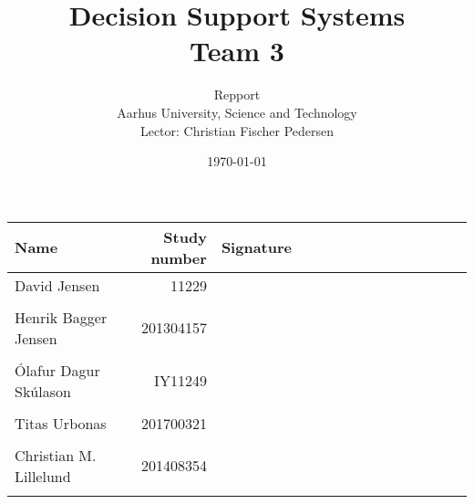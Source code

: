 \documentclass[a4paper,11pt,twoside,openright]{memoir}
\title{Decision Support Systems \\ Team 3}
\author{Repport \\ Aarhus University, Science and Technology \\ Lector: Christian Fischer Pedersen}
\date{\today}
\begin{document}
\fancyhf{} %
\frontmatter
\maketitle
\vfill


\begin{table} [h]
	\centering
	\begin{tabular}{|l|r|l|}
	\hline 
	\textbf{Name} 				& \textbf{Study number} & \textbf{Signature~~~~~~~~~~~~~~~~~~~~} 	\\ \hline
	David Jensen 				& 11229 	& \\ && 												\\ \hline
	Henrik Bagger Jensen 		& 201304157 & \\ && 												\\ \hline
	Ólafur Dagur Skúlason 		& IY11249	& \\ && 												\\ \hline
	Titas Urbonas 				& 201700321 & \\ && 												\\ \hline
	Christian M. Lillelund 		& 201408354 & \\ && 												\\ \hline

	\end{tabular}
\end{table}

\clearpage
\pagestyle{plain}

\tableofcontents

\vfill

\mainmatter
\pagestyle{fancy}
\fancyhf{} %
\fancyhead[CE,CO]{\nouppercase{\leftmark}}
\fancyfoot[CO,CE]{\nouppercase{\rightmark}}
\fancyfoot[LE,RO]{\thepage}

								    \cleartorightpage
										\cleartorightpage

\cleartorightpage
							\cleartorightpage
							\cleartorightpage
							\cleartorightpage
						\cleartorightpage
								        \cleartorightpage
										\cleartorightpage
									\cleartorightpage
									\cleartorightpage

\end{document}
